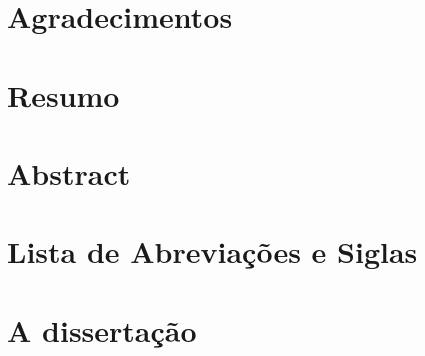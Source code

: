 \documentclass[12pt,a4paper]{report}
\begin{document}



  
  
  
  
  
  
  \chapter*{Agradecimentos}
  
  
  \chapter*{Resumo}
  
  \chapter*{Abstract}
  

  \chapter*{Lista de Abreviações e Siglas}
  


  \listoffigures
  \listoftables
  \tableofcontents

  
  \chapter*{A dissertação}
  
  
\end{document}
